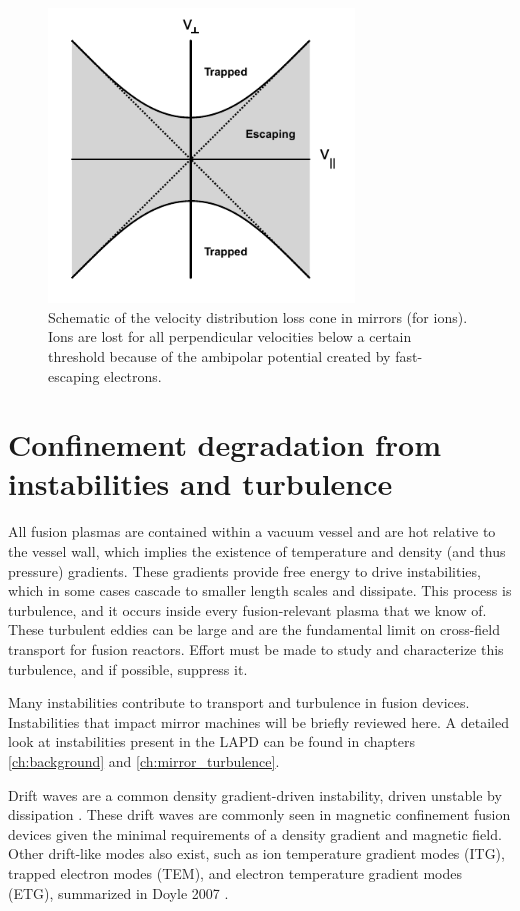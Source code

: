 \begin{figure}
	\centering
	\includegraphics[width=230pt]{figures/loss-cone.pdf}
	\caption[The mirror machine loss cone]{\label{fig:loss-cone}Schematic of the velocity distribution loss cone in mirrors (for ions). Ions are lost for all perpendicular velocities below a certain threshold because of the ambipolar potential created by fast-escaping electrons.}
\end{figure}

\section{Confinement degradation from instabilities and turbulence}

All fusion plasmas are contained within a vacuum vessel and are hot relative to the vessel wall, which implies the existence of temperature and density (and thus pressure) gradients. These gradients provide free energy to drive instabilities, which in some cases cascade to smaller length scales and dissipate. This process is turbulence, and it occurs inside every fusion-relevant plasma that we know of. These turbulent eddies can be large and are the fundamental limit on cross-field transport for fusion reactors. Effort must be made to study and characterize this turbulence, and if possible, suppress it. 

Many instabilities contribute to transport and turbulence in fusion devices. Instabilities that impact mirror machines will be briefly reviewed here. A detailed look at instabilities present in the LAPD can be found in chapters \ref{ch:background} and \ref{ch:mirror_turbulence}.

Drift waves are a common density gradient-driven instability, driven unstable by dissipation \cite{hendel_collisional_1968, Horton_1999, Tynan_review_2009}. These drift waves are commonly seen in magnetic confinement fusion devices given the minimal requirements of a density gradient and magnetic field. Other drift-like modes also exist, such as ion temperature gradient modes (ITG), trapped electron modes (TEM), and electron temperature gradient modes (ETG), summarized in Doyle 2007 \cite{physics_chapter_2007}.

